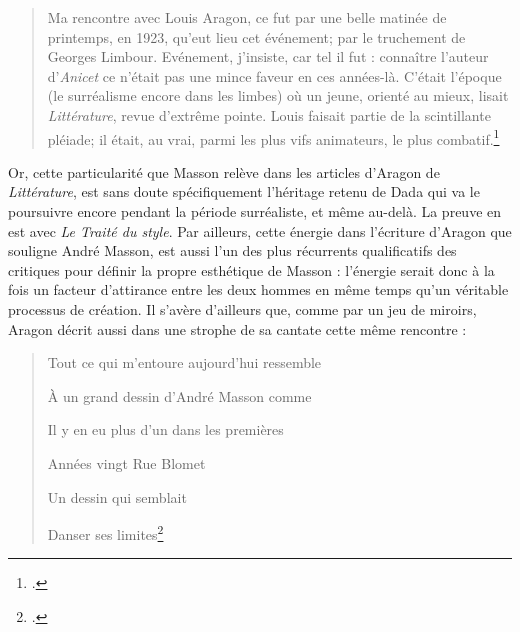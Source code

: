 \begin{quote} Ma rencontre avec Louis Aragon, ce fut par une belle matinée de printemps, en 1923, qu’eut lieu cet événement; par le truchement de Georges Limbour. Evénement, j’insiste, car tel il fut : connaître l’auteur d’\emph{Anicet} ce n’était pas une mince faveur en ces années-là. C’était l’époque (le surréalisme encore dans les limbes) où un jeune, orienté au mieux, lisait \emph{Littérature}, revue d’extrême pointe. Louis faisait partie de la scintillante pléiade; il était, au vrai, parmi les plus vifs animateurs, le plus combatif.\footcite[p84]{rebelle}\end{quote}

	Or, cette particularité que Masson relève dans les articles d’Aragon de \emph{Littérature}, est sans doute spécifiquement l’héritage retenu de Dada qui va le poursuivre encore pendant la période surréaliste, et même au-delà. La preuve en est avec \emph{Le Traité du style}. Par ailleurs, cette énergie dans l’écriture d’Aragon que souligne André Masson, est aussi l’un des plus récurrents qualificatifs des critiques pour définir la propre esthétique de Masson : l’énergie serait donc à la fois un facteur d’attirance entre les deux hommes en même temps qu’un véritable processus de création. Il s’avère d’ailleurs que, comme par un jeu de miroirs, Aragon décrit aussi dans une strophe de sa cantate cette même rencontre :

    
\begin{verse}    
Tout ce qui m’entoure aujourd’hui ressemble

À un grand dessin d’André Masson comme

Il y en eu plus d’un dans les premières

Années vingt Rue Blomet 

Un dessin qui semblait

Danser ses limites\footcite[p. 682]{ecritssurla} 
\end{verse}


